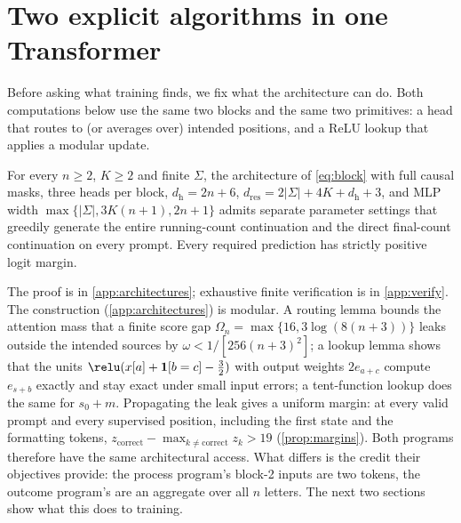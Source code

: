 \section{Two explicit algorithms in one Transformer}\label{sec:results}\label{sec:executors}
Before asking what training finds, we fix what the architecture can do. Both computations below use the same two blocks and the same two primitives: a head that routes to (or averages over) intended positions, and a ReLU lookup that applies a modular update.
\begin{center}\small
{}
\end{center}

\begin{proposition}\label{prop:represent}
For every $n\ge2$, $K\ge2$ and finite $\Sigma$, the architecture of \cref{eq:block} with full causal masks, three heads per block, $d_{\mathrm h}=2n+6$, $d_{\mathrm{res}}=2|\Sigma|+4K+d_{\mathrm h}+3$, and MLP width $\max\{|\Sigma|,3K(n+1),2n+1\}$ admits separate parameter settings that greedily generate the entire running-count continuation and the direct final-count continuation on every prompt. Every required prediction has strictly positive logit margin.
\end{proposition}
The proof is in \cref{app:architectures}; exhaustive finite verification is in \cref{app:verify}.
The construction (\cref{app:architectures}) is modular. A routing lemma bounds the attention mass that a finite score gap $\Omega_n=\max\{16,3\log(8(n+3))\}$ leaks outside the intended sources by $\omega<1/[256(n+3)^2]$; a lookup lemma shows that the units $\relu(x[a]+\mathbf 1[b=c]-\frac32)$ with output weights $2e_{a+c}$ compute $e_{s+b}$ exactly and stay exact under small input errors; a tent-function lookup does the same for $s_0+m$. Propagating the leak gives a uniform margin: at every valid prompt and every supervised position, including the first state and the formatting tokens, $z_{\mathrm{correct}}-\max_{k\ne\mathrm{correct}}z_k>19$ (\cref{prop:margins}). Both programs therefore have the same architectural access. What differs is the credit their objectives provide: the process program's block-2 inputs are two tokens, the outcome program's are an aggregate over all $n$ letters. The next two sections show what this does to training.


